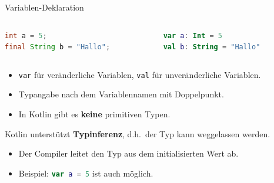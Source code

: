 \documentclass{beamer}
\begin{document}
\begin{frame}[fragile]{Variablen-Deklaration}
  \begin{columns}
    \begin{column}{0.5\textwidth}
      \begin{lstlisting}[language=Java, title=Java, xleftmargin=1em]
int a = 5;
final String b = "Hallo";
      \end{lstlisting}
    \end{column}
    \begin{column}{0.5\textwidth}
      \begin{lstlisting}[language=Kotlin, title=Kotlin, xleftmargin=1em, numbers=none]
var a: Int = 5
val b: String = "Hallo"
      \end{lstlisting}
    \end{column}
  \end{columns}
  \pause\vspace{0.5cm}
  \begin{itemize}
    \item \texttt{var} für veränderliche Variablen, \texttt{val} für unveränderliche Variablen.
    \item Typangabe nach dem Variablennamen mit Doppelpunkt.
    \item In Kotlin gibt es \textbf{keine} primitiven Typen. %
  \end{itemize}
  \pause\vspace{0.5cm}
  Kotlin unterstützt \textbf{Typinferenz}, d.h.\ der Typ kann weggelassen werden.
  \begin{itemize}
    \item Der Compiler leitet den Typ aus dem initialisierten Wert ab.
    \item Beispiel: \lstinline[language=kotlin]|var a = 5| ist auch möglich. %
  \end{itemize}
\end{frame}
\end{document}
